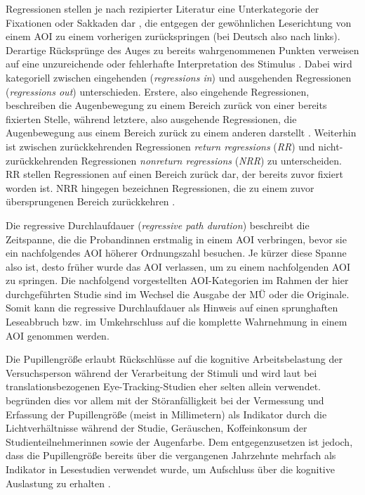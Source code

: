 Regressionen stellen je nach rezipierter Literatur eine Unterkategorie der Fixationen oder Sakkaden dar \citep[]{duchowski_eye_2017, holmqvist_eye_2011, iqbal_towards_2005}, die entgegen der gewöhnlichen Leserichtung von einem AOI zu einem vorherigen zurückspringen (bei Deutsch also nach links). Derartige Rücksprünge des Auges zu bereits wahrgenommenen Punkten verweisen auf eine unzureichende oder fehlerhafte Interpretation des Stimulus \citep[1]{eskenazi_regressions_2017}. Dabei wird kategoriell zwischen eingehenden (\emph{regressions in}) und ausgehenden Regressionen (\emph{regressions out}) unterschieden. Erstere, also eingehende Regressionen, beschreiben die Augenbewegung zu einem Bereich zurück von einer bereits fixierten Stelle, während letztere, also ausgehende Regressionen, die Augenbewegung aus einem Bereich zurück zu einem anderen darstellt \citep[24]{jakobsen_reading_2017}. Weiterhin ist zwischen zurückkehrenden Regressionen \emph{return regressions} (\emph{RR}) und nicht-zurückkehrenden Regressionen \emph{nonreturn regressions} (\emph{NRR}) zu unterscheiden. RR stellen Regressionen auf einen Bereich zurück dar, der bereits zuvor fixiert worden ist. NRR hingegen bezeichnen Regressionen, die zu einem zuvor übersprungenen Bereich zurückkehren \citep[3]{eskenazi_regressions_2017}.

Die regressive Durchlaufdauer (\emph{regressive path duration}) beschreibt die Zeitspanne, die die Proband{\textperiodcentered}innen erstmalig in einem AOI verbringen, bevor sie ein nachfolgendes AOI höherer Ordnungszahl besuchen. Je kürzer diese Spanne also ist, desto früher wurde das AOI verlassen, um zu einem nachfolgenden AOI zu springen. Die nachfolgend vorgestellten AOI-Kategorien im Rahmen der hier durchgeführten Studie sind im Wechsel die Ausgabe der MÜ oder die Originale. Somit kann die regressive Durchlaufdauer als Hinweis auf einen sprunghaften Leseabbruch bzw. im Umkehrschluss auf die komplette Wahrnehmung in einem AOI genommen werden.

Die Pupillengröße erlaubt Rückschlüsse auf die kognitive Arbeitsbelastung der Versuchsperson während der Verarbeitung der Stimuli und wird laut \citet[25]{jakobsen_reading_2017} bei translationsbezogenen Eye-Tracking-Studien eher selten allein verwendet. \citet[2]{doherty_eye_2010} begründen dies vor allem mit der Störanfälligkeit bei der Vermessung und Erfassung der Pupillengröße (meist in Millimetern) als Indikator durch die Lichtverhältnisse während der Studie, Geräuschen, Koffeinkonsum der Studienteilnehmer{\textperiodcentered}innen sowie der Augenfarbe. Dem entgegenzusetzen ist jedoch, dass die Pupillengröße bereits über die vergangenen Jahrzehnte mehrfach als Indikator in Lesestudien verwendet wurde, um Aufschluss über die kognitive Auslastung zu erhalten \citep[vgl. z.\,B.][]{hess_pupil_1964, beatty_pupillary_1966, kahneman_pupil_1966, beatty_task-evoked_1982, hyona_pupil_1995}.

